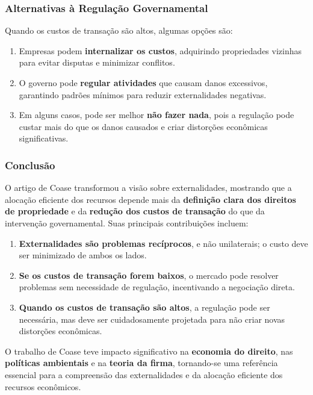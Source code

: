 \documentclass[a4paper,12pt]{article}[abntex2]
\begin{document}
\subsubsection{Alternativas à Regulação Governamental}

Quando os custos de transação são altos, algumas opções são:

\begin{enumerate}
    \item Empresas podem \textbf{internalizar os custos}, adquirindo propriedades vizinhas para evitar disputas e minimizar conflitos.
    \item O governo pode \textbf{regular atividades} que causam danos excessivos, garantindo padrões mínimos para reduzir externalidades negativas.
    \item Em alguns casos, pode ser melhor \textbf{não fazer nada}, pois a regulação pode custar mais do que os danos causados e criar distorções econômicas significativas.
\end{enumerate}

\subsubsection{Conclusão}

O artigo de Coase transformou a visão sobre externalidades, mostrando que a alocação eficiente dos recursos depende mais da \textbf{definição clara dos direitos de propriedade} e da \textbf{redução dos custos de transação} do que da intervenção governamental. Suas principais contribuições incluem:

\begin{enumerate}
    \item \textbf{Externalidades são problemas recíprocos}, e não unilaterais; o custo deve ser minimizado de ambos os lados.
    \item \textbf{Se os custos de transação forem baixos}, o mercado pode resolver problemas sem necessidade de regulação, incentivando a negociação direta.
    \item \textbf{Quando os custos de transação são altos}, a regulação pode ser necessária, mas deve ser cuidadosamente projetada para não criar novas distorções econômicas.
\end{enumerate}

O trabalho de Coase teve impacto significativo na \textbf{economia do direito}, nas \textbf{políticas ambientais} e na \textbf{teoria da firma}, tornando-se uma referência essencial para a compreensão das externalidades e da alocação eficiente dos recursos econômicos.
\end{document}
